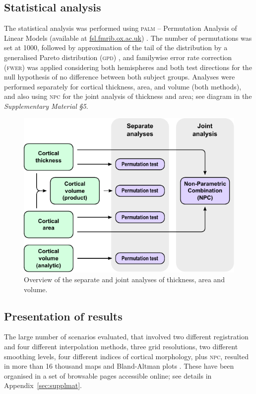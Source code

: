 \subsection{Statistical analysis}

The statistical analysis was performed using \textsc{palm} -- Permutation Analysis of Linear Models (available at \href{http://fsl.fmrib.ox.ac.uk}{fsl.fmrib.ox.ac.uk}) \citep{Winkler2014, Winkler2016_npc}. The number of permutations was set at 1000, followed by approximation of the tail of the distribution by a generalised Pareto distribution (\textsc{gpd}) \citep{Winkler2016_fast}, and familywise error rate correction (\textsc{fwer}) was applied considering both hemispheres and both test directions for the null hypothesis of no difference between both subject groups. Analyses were performed separately for cortical thickness, area, and volume (both methods), and also using \textsc{npc} for the joint analysis of thickness and area; see diagram in the \emph{Supplementary Material §5}.

\begin{figure}[!tp]
\begin{center}
\includegraphics{figures/flowstats.pdf}
\caption[Overview of the separate and joint analyses of thickness, area and volume.]{Overview of the separate and joint analyses of thickness, area and volume.}
\label{fig:flowstats}
\end{center}
\end{figure}

\subsection{Presentation of results}
\noindent
The large number of scenarios evaluated, that involved two different registration and four different interpolation methods, three grid resolutions, two different smoothing levels, four different indices of cortical morphology, plus \textsc{npc}, resulted in more than 16 thousand maps and Bland-Altman plots \citep{Bland1986}. These have been organised in a set of browsable pages accessible online; see details in Appendix~\ref{sec:supplmat}.

